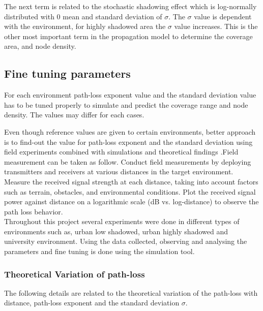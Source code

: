 The next term is related to the stochastic shadowing effect which is log-normally distributed with 0 mean and standard deviation of $\sigma$. The $\sigma$ value is dependent with the environment, for highly shadowed area the $\sigma$ value increases. This is the other most important term in the propagation model to determine the coverage area, and node density. \\

\subsection{Fine tuning parameters}
\label{sec:parameters}

For each environment path-loss exponent value and the standard deviation value has to be tuned properly to simulate and predict the coverage range and node density. The values may differ for each cases.
 
Even though reference values are given to certain environments, better approach is to find-out the value for path-loss exponent and the standard deviation using field experiments combined with simulations and theoretical findings .Field measurement can be taken as follow. Conduct field measurements by deploying transmitters and receivers at various distances in the target environment. Measure the received signal strength at each distance, taking into account factors such as terrain, obstacles, and environmental conditions. Plot the received signal power against distance on a logarithmic scale (dB vs. log-distance) to observe the path loss behavior.\\

Throughout this project several experiments were done in different types of environments such as, urban low shadowed, urban highly shadowed and university environment. Using the data collected, observing and analysing the parameters and fine tuning is done using the simulation tool.

\subsubsection{Theoretical Variation of path-loss}
The following details are related to the theoretical variation of the path-loss with distance, path-loss exponent and the standard deviation $\sigma$.\\

